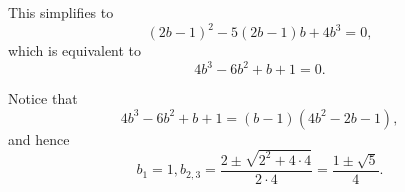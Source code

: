 \begin{enumerate}
          This simplifies to
          \[
              (2b - 1)^2 - 5 (2b - 1) b + 4 b^3 = 0,
          \]
          which is equivalent to
          \[
              4b^3 - 6b^2 + b + 1 = 0.
          \]

          Notice that
          \[
              4b^3 - 6b^2 + b + 1 = (b - 1)(4b^2 - 2b - 1),
          \]
          and hence
          \[
              b_1 = 1, b_{2, 3} = \frac{2 \pm \sqrt{2^2 + 4 \cdot 4}}{2 \cdot 4} = \frac{1 \pm \sqrt{5}}{4}.
          \]


\end{enumerate}